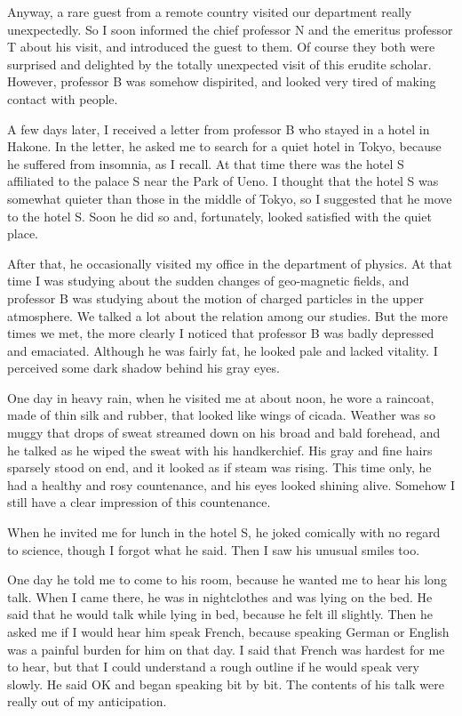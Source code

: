 \documentclass[11pt,a4j,twocolumn]{jarticle}
\begin{document}
Anyway, a rare guest from a remote country visited
our department really unexpectedly.
So I soon informed the chief professor N and the emeritus professor T
about his visit, and introduced the guest to them.
Of course they both were surprised and delighted by 
the totally unexpected visit of this erudite scholar.
However, professor B was somehow dispirited, and looked
very tired of making contact with people.

A few days later, I received a letter from professor B who
stayed in a hotel in Hakone. In the letter, he asked me
to search for a quiet hotel in Tokyo, because
he suffered from insomnia, as I recall.
At that time there was the hotel S affiliated to the palace S 
near the Park of Ueno. I thought that the hotel S was somewhat 
quieter than those in the middle of Tokyo, so I suggested 
that he move to the hotel S. 
Soon he did so and, fortunately, looked satisfied with the quiet place.

After that, he occasionally visited my office in the department of physics.
At that time I was studying about the sudden changes of geo-magnetic fields,
and professor B was studying about the motion of charged particles
in the upper atmosphere. 
We talked a lot about the relation among our studies.
But the more times we met, the more clearly I noticed that 
professor B was badly depressed and emaciated.
Although he was fairly fat, he looked pale and lacked vitality.
I perceived some dark shadow behind his gray eyes.

One day in heavy rain, when he visited me at about noon, 
he wore a raincoat, made of thin silk and rubber,
that looked like wings of cicada.
Weather was so muggy that drops of sweat streamed down 
on his broad and bald forehead, and he talked as he
wiped the sweat with his handkerchief.
His gray and fine hairs sparsely stood on end, 
and it looked as if steam was rising. 
This time only, he had a healthy and rosy countenance,
and his eyes looked shining alive.
Somehow I still have a clear impression of this countenance.

When he invited me for lunch in the hotel S, 
he joked comically with no regard to science, 
though I forgot what he said. Then I saw his unusual smiles too.

One day he told me to come to his room, because he wanted me 
to hear his long talk. When I came there, he was in nightclothes
and was lying on the bed. He said that
he would talk while lying in bed, because he felt ill slightly.
Then he asked me if I would hear him speak French, because
speaking German or English was a painful burden for him on that day.
I said that French was hardest for me to hear, but that
I could understand a rough outline if he would speak very slowly.
He said OK and began speaking bit by bit.
The contents of his talk were really out of my anticipation.
\end{document}
